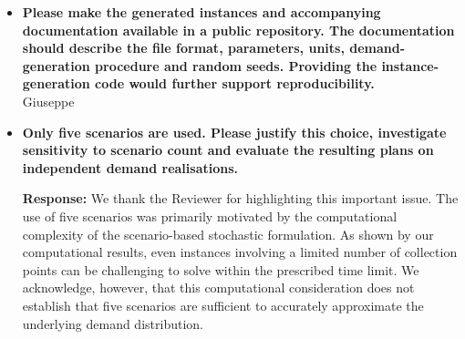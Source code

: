 \documentclass[11pt]{article}
\begin{document}
\begin{enumerate}
\begin{itemize}
\noindent\textbf{Response:} We thank the Reviewer for this observation. We acknowledge that the computational experiments are restricted to relatively small instances and that they do not establish the scalability of the proposed approach to large-scale waste collection systems. However, the primary objective of our computational study is to investigate the effectiveness of instance-dependent policy selection in a stochastic routing problem, rather than to demonstrate large-scale computational performance. The considered instance sizes were deliberately chosen to allow meaningful comparisons with the scenario-based stochastic formulation, which becomes computationally challenging even for a limited number of collection points. Indeed, our results show that obtaining high-quality reference solutions can be difficult even for instances with eight collection points. This computational difficulty is one of the motivations for investigating alternative deterministic optimization procedures and machine learning-based policy selection. We agree that experiments on larger instances would be necessary to establish practical scalability, and we have revised the manuscript to clarify the methodological scope of the computational study and explicitly acknowledge this limitation. We have also moderated the conclusions concerning computational efficiency and practical applicability, which are now restricted to the experimental setting considered.


\item \textbf{Please make the generated instances and accompanying documentation available in a
public repository. The documentation should describe the file format, parameters, units,
demand-generation procedure and random seeds. Providing the instance-generation code
would further support reproducibility.}\\
Giuseppe


\item \textbf{Only five scenarios are used. Please justify this choice, investigate sensitivity to
scenario count and evaluate the resulting plans on independent demand realisations.}


\noindent\textbf{Response:} We thank the Reviewer for highlighting this important issue. The use of five scenarios was primarily motivated by the computational complexity of the scenario-based stochastic formulation. As shown by our computational results, even instances involving a limited number of collection points can be challenging to solve within the prescribed time limit. We acknowledge, however, that this computational consideration does not establish that five scenarios are sufficient to accurately approximate the underlying demand distribution.


\end{itemize}
\end{enumerate}
\end{document}
